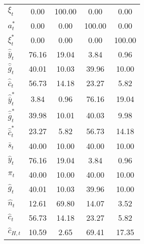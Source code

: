 \begin{center}
\begin{longtable}{lcccc}
${\xi_t}              $	 & 	                0.00	 & 	              100.00	 & 	                0.00	 & 	                0.00 \\ 
${a_t^*}              $	 & 	                0.00	 & 	                0.00	 & 	              100.00	 & 	                0.00 \\ 
${\xi_t^*}            $	 & 	                0.00	 & 	                0.00	 & 	                0.00	 & 	              100.00 \\ 
${\hat {\bar y}_t}    $	 & 	               76.16	 & 	               19.04	 & 	                3.84	 & 	                0.96 \\ 
${\hat {\bar g}_t}    $	 & 	               40.01	 & 	               10.03	 & 	               39.96	 & 	               10.00 \\ 
${\hat {\bar c}_t}    $	 & 	               56.73	 & 	               14.18	 & 	               23.27	 & 	                5.82 \\ 
${\hat {\bar y}_t^*}  $	 & 	                3.84	 & 	                0.96	 & 	               76.16	 & 	               19.04 \\ 
${\hat {\bar g}_t^*}  $	 & 	               39.98	 & 	               10.01	 & 	               40.03	 & 	                9.98 \\ 
${\hat {\bar c}_t^*}  $	 & 	               23.27	 & 	                5.82	 & 	               56.73	 & 	               14.18 \\ 
${\bar s_t}           $	 & 	               40.00	 & 	               10.00	 & 	               40.00	 & 	               10.00 \\ 
${\hat y_t}           $	 & 	               76.16	 & 	               19.04	 & 	                3.84	 & 	                0.96 \\ 
${\pi_t}              $	 & 	               40.00	 & 	               10.00	 & 	               40.00	 & 	               10.00 \\ 
${\hat g_t}           $	 & 	               40.01	 & 	               10.03	 & 	               39.96	 & 	               10.00 \\ 
${\hat n_t}           $	 & 	               12.61	 & 	               69.80	 & 	               14.07	 & 	                3.52 \\ 
${\hat c_t}           $	 & 	               56.73	 & 	               14.18	 & 	               23.27	 & 	                5.82 \\ 
${\hat c_{H,t}}       $	 & 	               10.59	 & 	                2.65	 & 	               69.41	 & 	               17.35 \\ 

\end{longtable}
\end{center}
